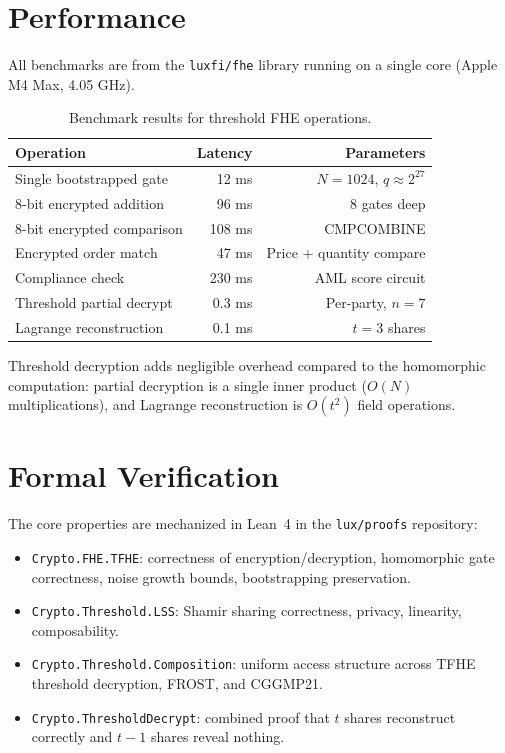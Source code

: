 \documentclass[11pt,a4paper]{article}
\begin{document}
\section{Performance}
\label{sec:perf}

All benchmarks are from the \texttt{luxfi/fhe} library running on a
single core (Apple M4 Max, 4.05 GHz).

\begin{table}[h]
\centering
\begin{tabular}{lrr}
\toprule
\textbf{Operation} & \textbf{Latency} & \textbf{Parameters} \\
\midrule
Single bootstrapped gate & 12 ms & $N{=}1024$, $q{\approx}2^{27}$ \\
8-bit encrypted addition & 96 ms & 8 gates deep \\
8-bit encrypted comparison & 108 ms & CMPCOMBINE \\
Encrypted order match & 47 ms & Price + quantity compare \\
Compliance check & 230 ms & AML score circuit \\
Threshold partial decrypt & 0.3 ms & Per-party, $n{=}7$ \\
Lagrange reconstruction & 0.1 ms & $t{=}3$ shares \\
\bottomrule
\end{tabular}
\caption{Benchmark results for threshold FHE operations.}
\label{tab:benchmarks}
\end{table}

Threshold decryption adds negligible overhead compared to the
homomorphic computation: partial decryption is a single inner product
($O(N)$ multiplications), and Lagrange reconstruction is $O(t^2)$
field operations.

\section{Formal Verification}
\label{sec:formal}

The core properties are mechanized in Lean~4 in the
\texttt{lux/proofs} repository:

\begin{itemize}[nosep]
  \item \texttt{Crypto.FHE.TFHE}: correctness of encryption/decryption,
        homomorphic gate correctness, noise growth bounds, bootstrapping
        preservation.
  \item \texttt{Crypto.Threshold.LSS}: Shamir sharing correctness,
        privacy, linearity, composability.
  \item \texttt{Crypto.Threshold.Composition}: uniform access structure
        across TFHE threshold decryption, FROST, and CGGMP21.
  \item \texttt{Crypto.ThresholdDecrypt}: combined proof that $t$
        shares reconstruct correctly and $t{-}1$ shares reveal nothing.
\end{itemize}
\end{document}
